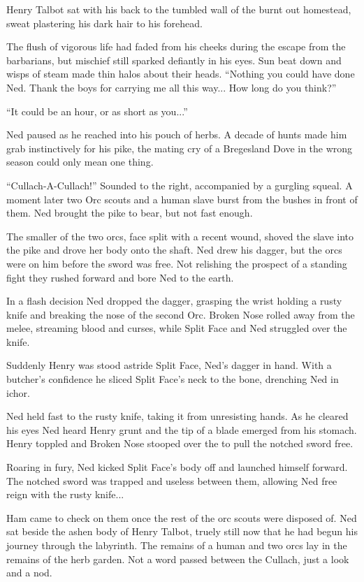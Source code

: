 \documentclass[twoside,11pt,b5paper,twocolumn]{scrbook}
\begin{document}
Henry Talbot sat with his back to the tumbled wall of the burnt out homestead, sweat plastering his dark hair to his forehead.

The flush of vigorous life had faded from his cheeks during the escape from the barbarians, but mischief still sparked defiantly in his eyes. Sun beat down and wisps of steam made thin halos about their heads. “Nothing you could have done Ned. Thank the boys for carrying me all this way... How long do you think?”

“It could be an hour, or as short as you...”

Ned paused as he reached into his pouch of herbs. A decade of hunts made him grab instinctively for his pike, the mating cry of a Bregesland Dove in the wrong season could only mean one thing.

“Cullach-A-Cullach!” Sounded to the right, accompanied by a gurgling squeal. A moment later two Orc scouts and a human slave burst from the bushes in front of them. Ned brought the pike to bear, but not fast enough.

The smaller of the two orcs, face split with a recent wound, shoved the slave into the pike and drove her body onto the shaft. Ned drew his dagger, but the orcs were on him before the sword was free. Not relishing the prospect of a standing fight they rushed forward and bore Ned to the earth.

In a flash decision Ned dropped the dagger, grasping the wrist holding a rusty knife and breaking the nose of the second Orc. Broken Nose rolled away from the melee, streaming blood and curses, while Split Face and Ned struggled over the knife.

Suddenly Henry was stood astride Split Face, Ned's dagger in hand. With a butcher's confidence he sliced Split Face's neck to the bone, drenching Ned in ichor.

Ned held fast to the rusty knife, taking it from unresisting hands. As he cleared his eyes Ned heard Henry grunt and the tip of a blade emerged from his stomach. Henry toppled and Broken Nose stooped over the to pull the notched sword free.

Roaring in fury, Ned kicked Split Face's body off and launched himself forward. The notched sword was trapped and useless between them, allowing Ned free reign with the rusty knife...

Ham came to check on them once the rest of the orc scouts were disposed of. Ned sat beside the ashen body of Henry Talbot, truely still now that he had begun his journey through the labyrinth. The remains of a human and two orcs lay in the remains of the herb garden. Not a word passed between the Cullach, just a look and a nod.
\end{document}
